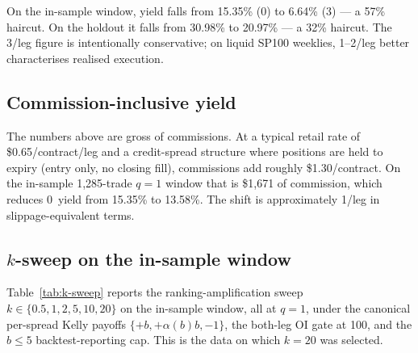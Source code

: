\documentclass[11pt]{article}
\begin{document}
On the in-sample window, yield falls from 15.35\% (0\textcent) to 6.64\%
(3\textcent) --- a 57\% haircut. On the holdout it falls from 30.98\% to
20.97\% --- a 32\% haircut. The 3\textcent/leg figure is intentionally
conservative; on liquid SP100 weeklies, 1--2\textcent/leg better
characterises realised execution.

\subsection{Commission-inclusive yield}\label{sec:results-commissions}

The numbers above are gross of commissions. At a typical retail rate of
\$0.65/contract/leg and a credit-spread structure where positions are
held to expiry (entry only, no closing fill), commissions add roughly
\$1.30/contract. On the in-sample 1{,}285-trade $q=1$ window that is
\$1{,}671 of commission, which reduces 0\textcent\ yield from 15.35\%
to 13.58\%. The shift is approximately 1\textcent/leg in
slippage-equivalent terms.

\subsection{\texorpdfstring{$k$}{k}-sweep on the in-sample window}\label{sec:k-sweep}

Table~\ref{tab:k-sweep} reports the ranking-amplification sweep
$k \in \{0.5, 1, 2, 5, 10, 20\}$ on the in-sample window, all at
$q=1$, under the canonical per-spread Kelly payoffs
$\{+b, +\alpha(b) b, -1\}$, the both-leg OI gate at 100, and the
$b \le 5$ backtest-reporting cap. This is the data on which $k = 20$ was selected.
\end{document}

